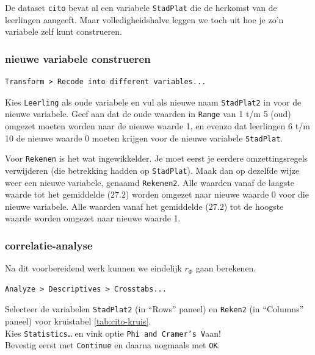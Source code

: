 \documentclass[
]{book}
\begin{document}
De dataset \texttt{cito} bevat al een variabele \texttt{StadPlat} die de herkomst van de leerlingen aangeeft. Maar volledigheidshalve leggen we toch uit hoe je zo'n variabele zelf kunt construeren.

\hypertarget{nieuwe-variabele-construeren}{%
\subsubsection{nieuwe variabele construeren}\label{nieuwe-variabele-construeren}}

\begin{verbatim}
Transform > Recode into different variables...
\end{verbatim}

Kies \texttt{Leerling} als oude variabele en vul als nieuwe naam \texttt{StadPlat2}
in voor de nieuwe variabele. Geef aan dat de oude waarden in \texttt{Range} van
1 t/m 5 (oud) omgezet moeten worden naar de nieuwe waarde 1, en evenzo
dat leerlingen 6 t/m 10 de nieuwe waarde 0 moeten krijgen voor de nieuwe
variabele \texttt{StadPlat}.

Voor \texttt{Rekenen} is het wat ingewikkelder. Je moet eerst je eerdere
omzettingsregels verwijderen (die betrekking hadden op \texttt{StadPlat}). Maak
dan op dezelfde wijze weer een nieuwe variabele, genaamd \texttt{Rekenen2}.
Alle waarden vanaf de laagste waarde tot het gemiddelde (\(27.2\)) worden
omgezet naar nieuwe waarde 0 voor die nieuwe variabele. Alle waarden
vanaf het gemiddelde (\(27.2\)) tot de hoogste waarde worden omgezet naar
nieuwe waarde 1.

\hypertarget{correlatie-analyse}{%
\subsubsection{correlatie-analyse}\label{correlatie-analyse}}

Na dit voorbereidend werk kunnen we eindelijk \(r_\Phi\) gaan berekenen.

\begin{verbatim}
Analyze > Descriptives > Crosstabs...
\end{verbatim}

Selecteer de variabelen \texttt{StadPlat2} (in ``Rows'' paneel) en \texttt{Reken2}
(in ``Columns'' paneel) voor
kruistabel \ref{tab:cito-kruis}.\\
Kies \texttt{Statistics\ldots{}} en vink optie \texttt{Phi\ and\ Cramer’s\ V}aan!\\
Bevestig eerst met \texttt{Continue} en daarna nogmaals met \texttt{OK}.
\end{document}
